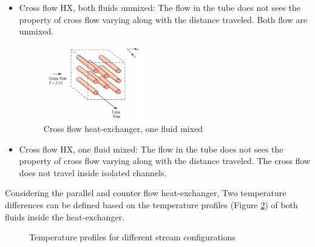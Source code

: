 \begin{itemize}
    \item Cross flow HX, both fluids unmixed: The flow in the tube does not sees the property of cross flow varying along with the distance traveled. Both flow are unmixed.
          \newpage
          \begin{figure}[h]
              \centering
              \includegraphics[width=0.4\textwidth]{crossed_flow_one_mixed}
              \caption{Cross flow heat-exchanger, one fluid mixed \cite{Ngendakumana2018}}
              \label{fig:C3_cross_flow_1mixed}
          \end{figure}

    \item Cross flow HX, one fluid mixed: The flow in the tube does not sees the property of cross flow varying along with the distance traveled. The cross flow does not travel inside isolated channels.
\end{itemize}

Considering the parallel and counter flow heat-exchanger, Two temperature differences can be defined based on the temperature profiles (Figure \ref{fig:C3_Tprof}) of both fluids inside the heat-exchanger.

\begin{figure}[h]
    \centering
    \hfill
    \caption{Temperature profiles for different stream configurations}\label{fig:C3_Tprof}
\end{figure}

